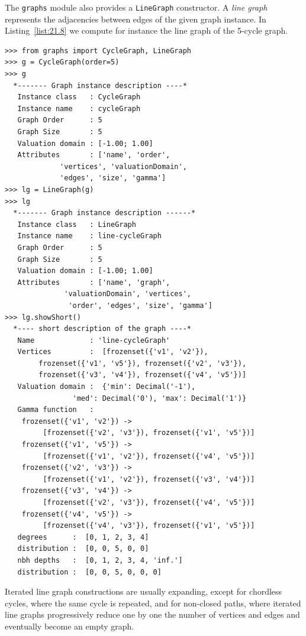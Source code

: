 The \texttt{graphs} module also provides a \texttt{LineGraph} constructor. A \emph{line graph} represents the adjacencies between edges of the given graph instance. In Listing~\vref{list:21.8} we compute for instance the line graph of the 5-cycle graph.
\begin{lstlisting}[caption={Computing the line graph of the 5-cycle graph},label=list:21.8]
>>> from graphs import CycleGraph, LineGraph
>>> g = CycleGraph(order=5)
>>> g
  *------- Graph instance description ----*
   Instance class   : CycleGraph
   Instance name    : cycleGraph
   Graph Order      : 5
   Graph Size       : 5
   Valuation domain : [-1.00; 1.00]
   Attributes       : ['name', 'order',
             'vertices', 'valuationDomain',
             'edges', 'size', 'gamma']
>>> lg = LineGraph(g)
>>> lg
  *------- Graph instance description ------*
   Instance class   : LineGraph
   Instance name    : line-cycleGraph
   Graph Order      : 5
   Graph Size       : 5
   Valuation domain : [-1.00; 1.00]
   Attributes       : ['name', 'graph',
              'valuationDomain', 'vertices',
               'order', 'edges', 'size', 'gamma']
>>> lg.showShort()
  *---- short description of the graph ----*
   Name             : 'line-cycleGraph'
   Vertices         :  [frozenset({'v1', 'v2'}),
        frozenset({'v1', 'v5'}), frozenset({'v2', 'v3'}),
        frozenset({'v3', 'v4'}), frozenset({'v4', 'v5'})]
   Valuation domain :  {'min': Decimal('-1'),
                'med': Decimal('0'), 'max': Decimal('1')}
   Gamma function   : 
    frozenset({'v1', 'v2'}) ->
         [frozenset({'v2', 'v3'}), frozenset({'v1', 'v5'})]
    frozenset({'v1', 'v5'}) ->
         [frozenset({'v1', 'v2'}), frozenset({'v4', 'v5'})]
    frozenset({'v2', 'v3'}) ->
         [frozenset({'v1', 'v2'}), frozenset({'v3', 'v4'})]
    frozenset({'v3', 'v4'}) ->
         [frozenset({'v2', 'v3'}), frozenset({'v4', 'v5'})]
    frozenset({'v4', 'v5'}) ->
         [frozenset({'v4', 'v3'}), frozenset({'v1', 'v5'})]
   degrees      :  [0, 1, 2, 3, 4]
   distribution :  [0, 0, 5, 0, 0]
   nbh depths   :  [0, 1, 2, 3, 4, 'inf.']
   distribution :  [0, 0, 5, 0, 0, 0]
\end{lstlisting}

Iterated line graph constructions are usually expanding, except for chordless cycles, where the same cycle is repeated, and for non-closed paths, where iterated line graphs progressively reduce one by one the number of vertices and edges and eventually become an empty graph.

